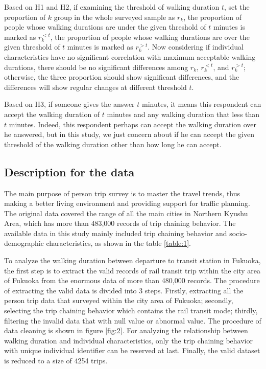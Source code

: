 \documentclass[Journal,letterpaper]{ascelike-new}
\begin{document}
Based on H1 and H2, if examining the threshold of walking duration $t$, set the proportion of $k$ group in the whole surveyed sample as $r_k$, the proportion of people whose walking durations are under the given threshold of $t$ minutes is marked as $r_{k}^{<t}$, the proportion of people whose walking durations are over the given threshold of $t$ minutes is marked as $r_{k}^{>t}$. Now considering if individual characteristics have no significant correlation with maximum acceptable walking durations, there should be no significant differences among $r_k$, $r_{k}^{<t}$, and $r_{k}^{>t}$; otherwise, the three proportion should show significant differences, and the differences will show regular changes at different threshold $t$.

Based on H3, if someone gives the answer $t$ minutes, it means this respondent can accept the walking duration of $t$ minutes and any walking duration that less than $t$ minutes. Indeed, this respondent perhaps can accept the walking duration over he answered, but in this study, we just concern about if he can accept the given threshold of the walking duration other than how long he can accept.

%
\subsection{Description for the data}
The main purpose of person trip survey is to master the travel trends, thus making a better living environment and providing support for traffic planning. The original data covered the range of all the main cities in Northern Kyushu Area, which has more than 483,000 records of trip chaining behavior. The available data in this study mainly included trip chaining behavior and socio-demographic characteristics, as shown in the table \ref{table:1}.

%
To analyze the walking duration between departure to transit station in Fukuoka, the first step is to extract the valid records of rail transit trip within the city area of Fukuoka from the enormous data of more than 480,000 records. The procedure of extracting the valid data is divided into 3 steps. Firstly, extracting all the person trip data that surveyed within the city area of Fukuoka; secondly, selecting the trip chaining behavior which contains the rail transit mode; thirdly, filtering the invalid data that with null value or abnormal value. The procedure of data cleaning is shown in figure \ref{fig:2}. For analyzing the relationship between walking duration and individual characteristics, only the trip chaining behavior with unique individual identifier can be reserved at last. Finally, the valid dataset is reduced to a size of 4254 trips.
\end{document}
